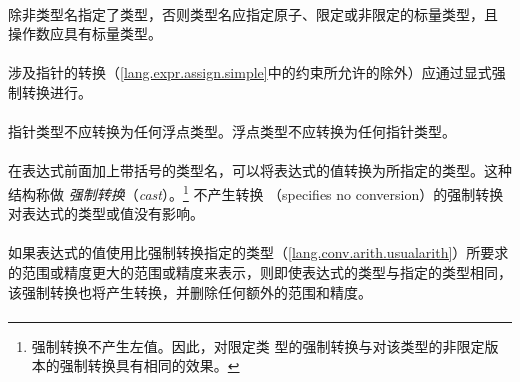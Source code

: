 {

\syntax
\paragraph{}

\constraint
\paragraph{}
除非类型名指定了类型，否则类型名应指定原子、限定或非限定的标量类型，且
操作数应具有标量类型。

\paragraph{}
涉及指针的转换（\ref{lang.expr.assign.simple}中的约束所允许的除外）应通过显式强
制转换进行。

\paragraph{}
指针类型不应转换为任何浮点类型。浮点类型不应转换为任何指针类型。

\semantic
\paragraph{}
在表达式前面加上带括号的类型名，可以将表达式的值转换为所指定的类型。这种结构称做
\textit{强制转换}（\textit{cast}）。\footnote{强制转换不产生左值。因此，对限定类
型的强制转换与对该类型的非限定版本的强制转换具有相同的效果。} 不产生转换
（specifies no conversion）的强制转换对表达式的类型或值没有影响。

\paragraph{}
如果表达式的值使用比强制转换指定的类型（\ref{lang.conv.arith.usualarith}）所要求
的范围或精度更大的范围或精度来表示，则即使表达式的类型与指定的类型相同，
该强制转换也将产生转换，并删除任何额外的范围和精度。


\syntax
\paragraph{}

}
